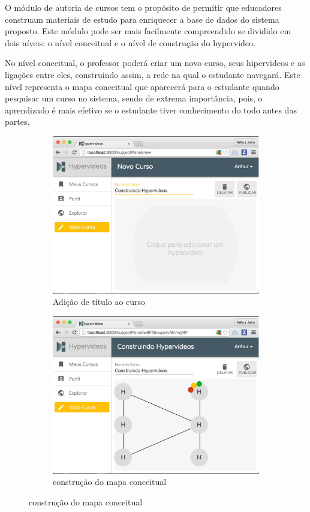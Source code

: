 O módulo de autoria de cursos tem o propósito de permitir que educadores construam materiais de estudo para enriquecer a base de dados do sistema proposto. Este módulo pode ser mais facilmente compreendido se dividido em dois níveis: o nível conceitual e o nível de construção do hypervideo.

No nível conceitual, o professor poderá criar um novo curso, seus hipervideos e as ligações entre eles, construindo assim, a rede na qual o estudante navegará. Este nível representa o mapa conceitual que aparecerá para o estudante quando pesquisar um curso no sistema, sendo de extrema importância, pois, o aprendizado é mais efetivo se o estudante tiver conhecimento do todo antes das partes.

\begin{figure}[h!]
  	\centering
  	\begin{subfigure}{.5\textwidth}
  		\centering
  		\includegraphics[width=.9\linewidth]{figuras/autoria_conceitual_a.eps}
  		\caption{Adição de título ao curso}
  		\label{fig:autoria_conceitual_a}
	\end{subfigure}%
	\begin{subfigure}{.5\textwidth}
  		\centering
  		\includegraphics[width=.9\linewidth]{figuras/autoria_conceitual_b.eps}
  		\caption{construção do mapa conceitual}
  		\label{fig:autoria_conceitual_b}
	\end{subfigure}%
	

\end{figure}
